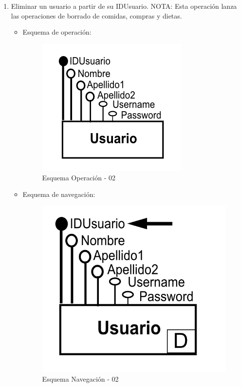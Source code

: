\documentclass[a4paper,12pt]{report}
\begin{document}
\begin{enumerate}
\item Eliminar un usuario a partir de su IDUsuario.
NOTA: Esta operación lanza las operaciones de borrado de comidas, compras y dietas.
\begin{itemize}
\item Esquema de operación:
\begin{figure}[!htp]
\centering
\includegraphics[width=0.9\linewidth]{./operaciones/img/Usuarios/02_ope.png}
\caption{Esquema Operación - 02}
\label{fig:ope02}
\medskip
\footnotesize
{}
\end{figure}
\item Esquema de navegación:
\begin{figure}[!htp]
\centering
\includegraphics[width=0.9\linewidth]{./operaciones/img/Usuarios/02_nav.png}
\caption{Esquema Navegación - 02}
\label{fig:nave02}
\medskip
\footnotesize
{}
\end{figure}
\end{itemize}


\end{enumerate}
\end{document}
